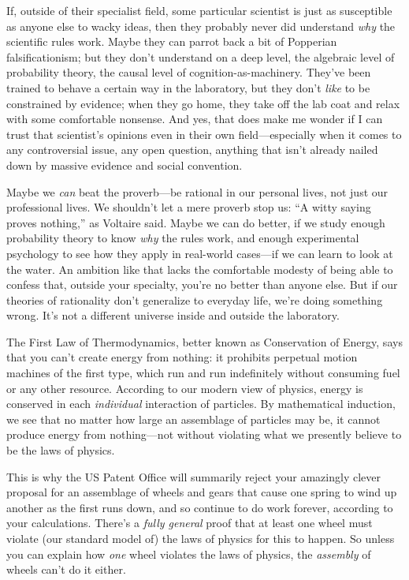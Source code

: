 {
 If, outside of their specialist field, some particular scientist
is just as susceptible as anyone else to wacky ideas, then they
probably never did understand \textit{why} the scientific rules work.
Maybe they can parrot back a bit of Popperian falsificationism; but
they don't understand on a deep level, the algebraic
level of probability theory, the causal level of
cognition-as-machinery. They've been trained to behave
a certain way in the laboratory, but they don't
\textit{like} to be constrained by evidence; when they go home, they
take off the lab coat and relax with some comfortable nonsense. And
yes, that does make me wonder if I can trust that
scientist's opinions even in their own
field---especially when it comes to any controversial issue, any open
question, anything that isn't already nailed down by
massive evidence and social convention.}

{
 Maybe we \textit{can} beat the proverb---be rational in our
personal lives, not just our professional lives. We
shouldn't let a mere proverb stop us:
``A witty saying proves nothing,''
as Voltaire said. Maybe we can do better, if we study enough
probability theory to know \textit{why} the rules work, and enough
experimental psychology to see how they apply in real-world cases---if
we can learn to look at the water. An ambition like that lacks the
comfortable modesty of being able to confess that, outside your
specialty, you're no better than anyone else. But if
our theories of rationality don't generalize to
everyday life, we're doing something wrong.
It's not a different universe inside and outside the
laboratory.}

\myendsectiontext


{
 The First Law of Thermodynamics, better known as Conservation of
Energy, says that you can't create energy from nothing:
it prohibits perpetual motion machines of the first type, which run and
run indefinitely without consuming fuel or any other resource.
According to our modern view of physics, energy is conserved in each
\textit{individual} interaction of particles. By mathematical
induction, we see that no matter how large an assemblage of particles
may be, it cannot produce energy from nothing---not without violating
what we presently believe to be the laws of physics. }

{
 This is why the US Patent Office will summarily reject your
amazingly clever proposal for an assemblage of wheels and gears that
cause one spring to wind up another as the first runs down, and so
continue to do work forever, according to your calculations.
There's a \textit{fully general} proof that at least
one wheel must violate (our standard model of) the laws of physics for
this to happen. So unless you can explain how \textit{one} wheel
violates the laws of physics, the \textit{assembly} of wheels
can't do it either.}

